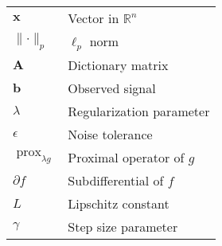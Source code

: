 \documentclass[12pt]{article}
\renewcommand{\vec}[1]{\mathbf{#1}}
\DeclareMathOperator{\prox}{prox}
\newcommand{\norm}[1]{\lVert#1\rVert}
\newcommand{\R}{\mathbb{R}}
\theoremstyle{definition}
\begin{document}
\begin{tabular}{ll}
    $\vec{x}$           & Vector in $\R^n$         \\
    $\norm{\cdot}_p$    & $\ell_p$ norm            \\
    $\mathbf{A}$        & Dictionary matrix        \\
    $\vec{b}$           & Observed signal          \\
    $\lambda$           & Regularization parameter \\
    $\epsilon$          & Noise tolerance          \\
    $\prox_{\lambda g}$ & Proximal operator of $g$ \\
    $\partial f$        & Subdifferential of $f$   \\
    $L$                 & Lipschitz constant       \\
    $\gamma$            & Step size parameter      \\
\end{tabular}



\end{document}
